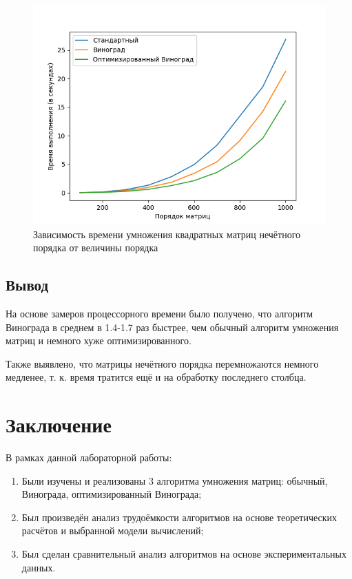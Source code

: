 \documentclass[12pt]{report}
\begin{document}
\begin{figure}[H]
	\centering
	\includegraphics[scale=0.8]{odd.png}
	\caption{Зависимость времени умножения квадратных матриц нечётного порядка от величины порядка}
	\label{oddGraph}
\end{figure}

\section{Вывод}

На основе замеров процессорного времени было получено, что алгоритм Винограда в среднем в 1.4-1.7 раз быстрее, чем обычный алгоритм умножения матриц и немного хуже оптимизированного.

Также выявлено, что матрицы нечётного порядка перемножаются немного медленее, т. к. время тратится ещё и на обработку последнего столбца.


\chapter*{Заключение}

В рамках данной лабораторной работы:

\begin{enumerate}
	\item Были изучены и реализованы 3 алгоритма умножения матриц: обычный, Винограда, оптимизированный Винограда;
	\item Был произведён анализ трудоёмкости алгоритмов на основе теоретических расчётов и выбранной модели вычислений;
	\item Был сделан сравнительный анализ алгоритмов на основе экспериментальных данных.
\end{enumerate}
\end{document}
